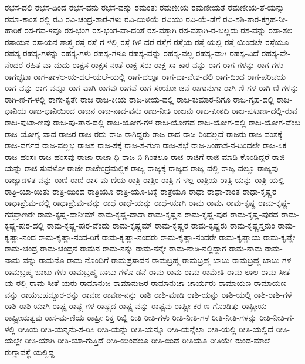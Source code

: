 ರಭಸ-ದಲಿ
ರಭಸ-ದಿಂದ
ರಭಸ-ವನು
ರಭಸ-ವನ್ನು
ರಮಂತಃ
ರಮಣೀಯ
ರಮಣೀಯತೆ
ರಮಣೀಯ-ತೆ-ಯನ್ನು
ರಮಾ-ಕಾಂತ
ರಲ್ಲಿ
ರವಿ
ರವಿ-ಚಂದ್ರ-ತಾರೆ-ಗಳು
ರವಿ-ಯಿಳಿಯೆ
ರವಿಯು
ರವಿ-ಯೆ-ಡೆಗೆ
ರವಿ-ಶಶಿ-ತಾರ-ಕಗ್ರಹ-ನೀ-ಹಾರಿಕೆ
ರಸ-ಗವ-ಳವೂ
ರಸ-ಭಂಗ
ರಸ-ಭಂಗ-ವಾ-ದಂತೆ
ರಸ-ವತ್ತಾಗಿ
ರಸ-ವತ್ತಾಗಿ-ರ-ಬಲ್ಲದು
ರಸ-ವನ್ನು
ರಸಾ-ತಲ
ರಸಾಯನ
ರಸಾಯನ-ಶಾಸ್ತ್ರ
ರಸ್ತೆ
ರಸ್ತೆ-ಗ-ಳಲ್ಲಿ
ರಸ್ತೆ-ಗಿಳಿ-ದರೆ
ರಸ್ತೆಗೆ
ರಸ್ತೆಯ
ರಸ್ತೆ-ಯಲ್ಲಿ
ರಸ್ತೆ-ಯಿಂದಲೇ
ರಸ್ತೆಯೂ
ರಹಸ್ಯ
ರಹಸ್ಯ-ಗಳನ್ನು
ರಹಸ್ಯ-ಗಳು
ರಹಸ್ಯ-ಗಳೂ
ರಹಸ್ಯ-ವನ್ನು
ರಹಸ್ಯ-ವಲ್ಲ
ರಹಸ್ಯ-ವಾಗಿ
ರಹಸ್ಯ-ವಿದೆ
ರಹಸ್ಯ-ವೇ-ನೆಂದರೆ
ರಹಿತ-ವಾ-ದುದು
ರಾಕ್ಷಸ
ರಾಕ್ಷಸ-ನಂತೆ
ರಾಕ್ಷ-ಸರು
ರಾಕ್ಷ-ಸಾ-ಕಾರ-ವನ್ನು
ರಾಗ
ರಾಗ-ಗಳನ್ನು
ರಾಗ-ಗಳು
ರಾಗಚ್ಛಟಾ
ರಾಗ-ತಾಳಲ-ಯ-ದಲೆ-ಯಲೆ-ಯಲ್ಲಿ
ರಾಗ-ದಲ್ಲೂ
ರಾಗ-ದಾ-ವೇಶ-ದಲಿ
ರಾಗ-ದಿಂದ
ರಾಗ-ಪರಿಚಯ
ರಾಗ-ವನ್ನು
ರಾಗ-ವನ್ನೂ
ರಾಗ-ವಾಗಿ
ರಾಗವು
ರಾಗವೆ
ರಾಗ-ಸಂಯೋ-ಜನೆ
ರಾಗಾನುಗಾ
ರಾಗಿ-ಣಿ-ಗಳ
ರಾಗಿ-ಣಿ-ಗಳನ್ನು
ರಾಗಿ-ಣಿ-ಗ-ಳಲ್ಲಿ
ರಾಗೇ-ಕೃತೇ
ರಾಜ
ರಾಜ-ಕೀಯ
ರಾಜ-ಕೀಯ-ದಲ್ಲಿ
ರಾಜ-ಕುಮಾರ-ನಿಗೂ
ರಾಜ-ಗೃಹ-ದಲ್ಲಿ
ರಾಜ-ಧಾನಿಯ
ರಾಜ-ಧಾನಿಯಿಂದ
ರಾಜನ
ರಾಜ-ನಾದ-ವನು
ರಾಜ-ನೀತಿ
ರಾಜನು
ರಾಜ-ಪೀಠದಿ
ರಾಜ-ಪುಟಾಣ-ದಲ್ಲಿ-ರುವ
ರಾಜ-ಪುಟಾ-ಣವು
ರಾಜ-ಪು-ತಾನ-ದಲ್ಲಿ
ರಾಜ-ಯೋಗ-ಗಳ
ರಾಜ-ಯೋಗದ
ರಾಜ-ಯೋಗ-ದಲ್ಲಿ
ರಾಜ-ಯೋಗ-ವೆಂಬ
ರಾಜ-ಯೋಗ್ಯ-ವಾದ
ರಾಜರ
ರಾಜ-ರದು
ರಾಜ-ರಾಗಿದ್ದರು
ರಾಜ-ರಾದ
ರಾಜ-ರಿಂದಲ್ಲದೆ
ರಾಜರು
ರಾಜ-ವಂಶಕ್ಕೆ
ರಾಜ-ವರ್ಗದ
ರಾಜ-ವಲ್ಲಭ
ರಾಜಸ
ರಾಜ-ಸಕ್ಕೆ
ರಾಜ-ಸ-ಗುಣ
ರಾಜ-ಸಭೆ
ರಾಜ-ಸಿಂಹಾಸ-ನ-ದಿಂದಲೇ
ರಾಜ-ಸಿಕ
ರಾಜ-ಹಂಸಃ
ರಾಜ-ಹಂಸವು
ರಾಜಾ
ರಾಜಾ-ಧಿ-ರಾಜ-ನಿ-ಗಿಂತಲೂ
ರಾಜಿ
ರಾಜಿಗೆ
ರಾಜಿ-ಮಾಡಿ-ಕೊಂಡಿದ್ದರೆ
ರಾಜಿ-ಯನ್ನು
ರಾಜಿ-ಸುವಳೋ
ರಾಜೇ
ರಾಜೇಂದ್ರಮಲ್ಲಿಕ
ರಾಜ್ಯ
ರಾಜ್ಯಕ್ಕೆ
ರಾಜ್ಯದ
ರಾಜ್ಯ-ದಲ್ಲಿ
ರಾಜ್ಯ-ದಲ್ಲೂ
ರಾಜ್ಯವು
ರಾಜ್ಯಾಡಳಿತ-ವನ್ನು
ರಾಣಿ
ರಾಣಿ-ರಾಸ-ಮ-ಣಿಯ
ರಾತ್ರಿ
ರಾತ್ರಿಂ
ರಾತ್ರಿ-ಗ-ಳಲ್ಲ
ರಾತ್ರಿಯ
ರಾತ್ರಿ-ಯನ್ನು
ರಾತ್ರಿ-ಯಲ್ಲಿ
ರಾತ್ರಿ-ಯಾ-ಯಿತು
ರಾತ್ರಿ-ಯಿಂದ
ರಾತ್ರಿಯೂ
ರಾತ್ರಿ-ಯೂ-ಟಕ್ಕೆ
ರಾತ್ರೆಯೂ
ರಾಧಾ
ರಾಧಾ-ಕಾಂತ
ರಾಧಾ-ಕೃಷ್ಣರ
ರಾಧಾಪ್ರೇಮ-ದಲ್ಲಿ
ರಾಧಾಪ್ರೇಮ-ವನ್ನು
ರಾಧೆ
ರಾಧೆ-ಯನ್ನು
ರಾಧೆ-ಯಾಗಿ
ರಾಮ
ರಾಮಃ
ರಾಮ-ಕೃಷ್ಣ
ರಾಮ-ಕೃಷ್ಣ-ಗತಪ್ರಾಣರೇ
ರಾಮ-ಕೃಷ್ಣ-ದಾನೀಮ್
ರಾಮ-ಕೃಷ್ಣ-ದಾಸಾ
ರಾಮ-ಕೃಷ್ಣನ
ರಾಮ-ಕೃಷ್ಣ-ಪುರ
ರಾಮ-ಕೃಷ್ಣ-ಪುರದ
ರಾಮ-ಕೃಷ್ಣ-ಪುರ-ದಲ್ಲಿ
ರಾಮ-ಕೃಷ್ಣ-ಪುರ-ವೆಂದು
ರಾಮ-ಕೃಷ್ಣಮ್
ರಾಮ-ಕೃಷ್ಣರ
ರಾಮ-ಕೃಷ್ಣರು
ರಾಮ-ಕೃಷ್ಣಸ್ತನುಂ
ರಾಮ-ಕೃಷ್ಣಾ-ನಂದ
ರಾಮ-ಕೃಷ್ಣಾ-ನಂದ-ರಿಗೆ
ರಾಮ-ಕೃಷ್ಣಾ-ನಂದರು
ರಾಮ-ಕೃಷ್ಣಾ-ನಂದರೇ
ರಾಮ-ಕೃಷ್ಣಾಯ
ರಾಮ-ಕೃಷ್ಣೇ
ರಾಮ-ಚಂದ್ರ
ರಾಮ-ಚಂದ್ರನ
ರಾಮನ
ರಾಮ-ನನ್ನು
ರಾಮ-ನನ್ನೇ
ರಾಮ-ನಾಡಿ-ನಲ್ಲಿದ್ದಾಗ
ರಾಮ-ನಾಮ
ರಾಮ-ನಾಮ-ವನ್ನು
ರಾಮನೊ
ರಾಮ-ನೊಂದಿಗೆ
ರಾಮಪ್ರಸಾದನ
ರಾಮಬ್ರಹ್ಮ
ರಾಮಬ್ರಹ್ಮ-ಬಾಬು
ರಾಮಬ್ರಹ್ಮ-ಬಾಬು-ಗಳ
ರಾಮಬ್ರಹ್ಮ-ಬಾಬು-ಗಳು
ರಾಮಬ್ರಹ್ಮ-ಬಾಬು-ಗಳೊ-ಡನೆ
ರಾಮ-ರಾಮ
ರಾಮ-ರಾಮೇತಿ
ರಾಮ-ಲಾಲ
ರಾಮ-ಸೀತೆ-ಯ-ರಲ್ಲಿ
ರಾಮ-ಸೀತೆ-ಯರು
ರಾಮಾನುಜ
ರಾಮಾನುಜರ
ರಾಮಾನುಜಾ-ಚಾರ್ಯರು
ರಾಮಾಯಣ
ರಾಮಾಯಣ-ವನ್ನು
ರಾಯಬಹದ್ದೂರ-ರನ್ನು
ರಾವಣ
ರಾವಣ-ನನ್ನು
ರಾಶಿ
ರಾಶಿ-ಮಾಡಿ
ರಾಶಿ-ಯನ್ನು
ರಾಶಿ-ಯಲ್ಲಿ
ರಾಶಿ-ರಾಶಿ-ಗಳೆ
ರಾಶಿ-ರಾಶಿ-ಯಾಗಿ
ರಾಷ್ಟ್ರ
ರಾಷ್ಟ್ರ-ಗಳ
ರಾಷ್ಟ್ರದ
ರಾಷ್ಟ್ರ-ವನ್ನು
ರಾಷ್ಟ್ರವು
ರಾಷ್ಟ್ರೀ-ಕರ-ಣ-ಗೊಂಡಿತ್ತು
ರಾಷ್ಟ್ರೀಯ
ರಾಷ್ಟ್ರೀಯತ್ವವು
ರಾಸ-ಮ-ಣಿಯ
ರಾಹ್ರೀ
ರಿಕ್ತ
ರಿಜ್ಲಿ
ರೀತಿ
ರೀತಿ-ಗಳು
ರೀತಿ-ನೀತಿ-ಗಳ
ರೀತಿ-ನೀತಿ-ಗಳನ್ನು
ರೀತಿ-ನೀತಿ-ಗ-ಳಲ್ಲಿ
ರೀತಿಯ
ರೀತಿ-ಯನ್ನನು-ಸ-ರಿಸಿ
ರೀತಿ-ಯನ್ನು
ರೀತಿ-ಯನ್ನೂ
ರೀತಿ-ಯನ್ನೆಲ್ಲಾ
ರೀತಿ-ಯಲ್ಲಿ
ರೀತಿ-ಯಲ್ಲಿದೆ
ರೀತಿ-ಯಲ್ಲೇ
ರೀತಿ-ಯಾಗಿ
ರೀತಿ-ಯಾ-ಗುತ್ತಿದೆ
ರೀತಿ-ಯಿಂದಲೂ
ರೀತಿ-ಯಿದೆ
ರೀತಿಯೂ
ರೀತಿಯೇ
ರುಂಡ-ಮಾಲೆ
ರುಗ್ಣಾವಸ್ಥೆ-ಯಲ್ಲಿದ್ದ
